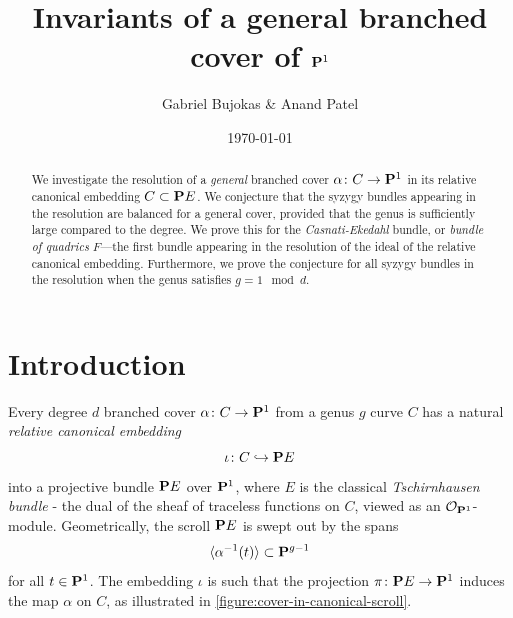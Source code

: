 \documentclass[11pt, two side, letterpaper, final]{amsart}
\title{Invariants of a general branched cover of $\P^1$}
\author{Gabriel Bujokas \& Anand Patel}
\date{\today}
\renewcommand{\P}{{\bf P}}
\newcommand {\from}{\colon}
\newcommand{\cO}{\mathcal{O}}
\begin{document}
\begin{abstract}
We investigate the resolution of a \emph{general} branched cover $\alpha \from C \to \P^1$ in its relative canonical embedding $C \subset \P E$.  We conjecture that the syzygy bundles appearing in the resolution are balanced for a general cover, provided that the genus is sufficiently large compared to the degree. We prove this for the \emph{Casnati-Ekedahl} bundle, or \emph{bundle of quadrics} $F$---the first bundle appearing in the resolution of the ideal of the relative canonical embedding. Furthermore, we prove the conjecture for all syzygy bundles in the resolution when the genus satisfies $g =  1 \mod d$.
\end{abstract}
\maketitle




\section{Introduction}
\label{sec:introduction}
Every degree $d$ branched cover $\alpha \from C \to \P^1$ from a genus $g$ curve $C$ has a natural  \emph{relative canonical embedding} $$\iota \from C \hookrightarrow \P E$$ into a projective bundle $\P E$ over $\P^{1}$, where $E$ is the classical \emph{Tschirnhausen bundle} -  the dual of the sheaf of traceless functions on $C$, viewed as an $\cO_{\P^1}$-module.  Geometrically, the scroll $\P E$ is swept out by the spans $$\langle \alpha^{-1}(t) \rangle \subset \P^{g-1}$$ for all $t \in \P^{1}$.  The embedding $\iota$ is such that the projection $\pi \from \P E \to \P^1$ induces the map $\alpha$ on $C$, as illustrated in \cref{figure:cover-in-canonical-scroll}.
\end{document}
